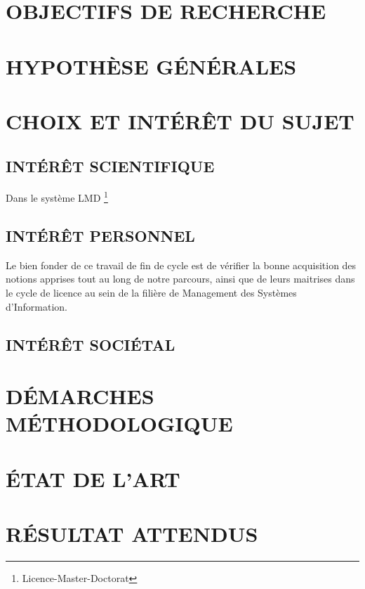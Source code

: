 \documentclass[a4paper,12pt,oneside]{book}
\begin{document}
\section[Objectifs de recherche]{OBJECTIFS DE RECHERCHE}

\section[Hyposthèses générales]{HYPOTHÈSE GÉNÉRALES}

\section[Choix et interet du sujet]{CHOIX ET INTÉRÊT DU SUJET}
\subsection[Interet scientifique]{INTÉRÊT SCIENTIFIQUE}
Dans le système LMD \footnote[1]{Licence-Master-Doctorat}

\subsection[Interet personnel]{INTÉRÊT PERSONNEL}
Le bien fonder de ce travail de fin de cycle est de
vérifier la bonne acquisition des notions apprises tout
au long de notre parcours, ainsi que de leurs maitrises
dans le cycle de licence au sein de la filière de Management
des Systèmes d’Information.

\subsection[Interet societal]{INTÉRÊT SOCIÉTAL}

\section[Démarches méthodologiques]{DÉMARCHES MÉTHODOLOGIQUE}

\section[Etat de l'art]{ÉTAT DE L’ART}

\section[Résultats attenus]{RÉSULTAT ATTENDUS}

\printbibliography
\end{document}
